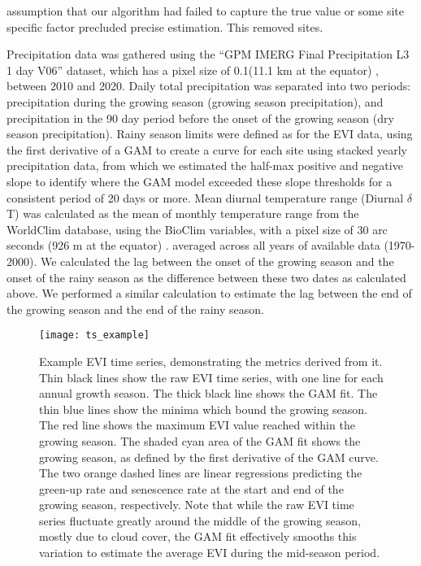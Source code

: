 \documentclass[11pt,a4paper]{article}
\begin{document}
assumption that our algorithm had failed to capture the true value or some site specific factor precluded precise estimation. This removed \vipphenOutlier{} sites. 

Precipitation data was gathered using the ``GPM IMERG Final Precipitation L3 1 day V06'' dataset, which has a pixel size of 0.1\textdegree (11.1 km at the equator) \citep{IMERG}, between 2010 and 2020. Daily total precipitation was separated into two periods: precipitation during the growing season (growing season precipitation), and precipitation in the 90 day period before the onset of the growing season (dry season precipitation). Rainy season limits were defined as for the EVI data, using the first derivative of a GAM to create a curve for each site using stacked yearly precipitation data, from which we estimated the half-max positive and negative slope to identify where the GAM model exceeded these slope thresholds for a consistent period of 20 days or more. Mean diurnal temperature range (Diurnal $\delta$T) was calculated as the mean of monthly temperature range from the WorldClim database, using the BioClim variables, with a pixel size of 30 arc seconds (926 m at the equator) \citep{Fick2017}. averaged across all years of available data (1970-2000). We calculated the lag between the onset of the growing season and the onset of the rainy season as the difference between these two dates as calculated above. We performed a similar calculation to estimate the lag between the end of the growing season and the end of the rainy season. 


\begin{figure}[H]
\centering
	\texttt{[image: ts\_example]}
	\caption{Example EVI time series, demonstrating the metrics derived from it. Thin black lines show the raw EVI time series, with one line for each annual growth season. The thick black line shows the GAM fit. The thin blue lines show the minima which bound the growing season. The red line shows the maximum EVI value reached within the growing season. The shaded cyan area of the GAM fit shows the growing season, as defined by the first derivative of the GAM curve. The two orange dashed lines are linear regressions predicting the green-up rate and senescence rate at the start and end of the growing season, respectively. Note that while the raw EVI time series fluctuate greatly around the middle of the growing season, mostly due to cloud cover, the GAM fit effectively smooths this variation to estimate the average EVI during the mid-season period.}
	\label{ts_example}
\end{figure}
\end{document}
